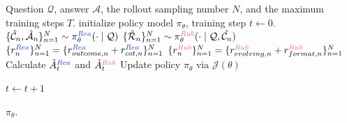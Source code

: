 \begin{algorithm}[t]
\captionsetup{labelformat=default,labelsep=colon,name=Algorithm}
   \caption{Policy Optimization with RLCER}
   \label{def:aglo}
\begin{algorithmic}
    Question $\mathcal{Q}$, answer $\mathcal{A}$, the rollout sampling number $N$, and the maximum training steps $T$.
    initialize policy model $\pi_\theta$, training step $t \leftarrow 0$.
    \STATE {} 
    \STATE $\{\hat{\mathcal{C}}_n, \hat{\mathcal{A}}_n\}_{n=1}^N \sim  \pi_{\theta}^{\text{\textcolor{reasoner}{$Rea$}}}(\cdot\mid\mathcal{Q})$
    \STATE {}
    \STATE $\{\hat{\mathcal{R}}_n\}_{n=1}^N \sim  \pi_{\theta}^{\text{\textcolor{rubricator}{$Rub$}}}(\cdot\mid\mathcal{Q}, \hat{\mathcal{C}_n})$
    \STATE {} 
    \STATE $\{r_n^{\text{\textcolor{reasoner}{$Rea$}}}\}_{n=1}^N =
    \{r^{\text{\textcolor{reasoner}{$Rea$}}}_{outcome,n} + r_{cot,n}^{\text{\textcolor{reasoner}{$Rea$}}}\}_{n=1}^N $
    \STATE {}
    \STATE $\{r_n^{\text{\textcolor{rubricator}{$Rub$}}}\}_{n=1}^N =  \{r_{evolving,n}^{\text{\textcolor{rubricator}{$Rub$}}} + r_{format,n}^{\text{\textcolor{rubricator}{$Rub$}}}\}_{n=1}^N $
    \STATE {} 
    \STATE Calculate $\hat{A}^{\text{\textcolor{reasoner}{$Rea$}}}_t$ and $\hat{A}^{\text{\textcolor{rubricator}{$Rub$}}}_t$
    \STATE {}
    \STATE Update policy $\pi_\theta$ via $\mathcal{J}(\theta)$

    \STATE $t \leftarrow t+1$
   \ENDWHILE

    $\pi_\theta$.
\end{algorithmic}

\end{algorithm}